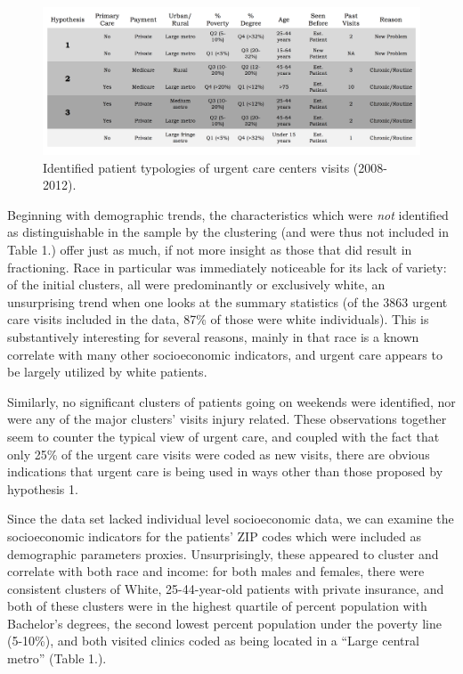 \documentclass[12pt,twoside]{reedthesis}
\begin{document}
  \newpage
  
  \begin{figure}[h!]
  \centering
  \includegraphics[angle = 90,scale = 0.45]{figures/clusters.png}
  \caption[Identified patient typologies of urgent care centers visits (2008-2012).]{\normalsize{Identified patient typologies of urgent care centers visits (2008-2012).}}
  \label{fig:clus1}
  \end{figure}
  
  \newpage
  
  Beginning with demographic trends, the characteristics which were
  \emph{not} identified as distinguishable in the sample by the clustering
  (and were thus not included in Table 1.) offer just as much, if not more
  insight as those that did result in fractioning. Race in particular was
  immediately noticeable for its lack of variety: of the initial clusters,
  all were predominantly or exclusively white, an unsurprising trend when
  one looks at the summary statistics (of the 3863 urgent care visits
  included in the data, 87\% of those were white individuals). This is
  substantively interesting for several reasons, mainly in that race is a
  known correlate with many other socioeconomic indicators, and urgent
  care appears to be largely utilized by white patients.
  
  Similarly, no significant clusters of patients going on weekends were
  identified, nor were any of the major clusters' visits injury related.
  These observations together seem to counter the typical view of urgent
  care, and coupled with the fact that only 25\% of the urgent care visits
  were coded as new visits, there are obvious indications that urgent care
  is being used in ways other than those proposed by hypothesis 1.
  
  Since the data set lacked individual level socioeconomic data, we can
  examine the socioeconomic indicators for the patients' ZIP codes which
  were included as demographic parameters proxies. Unsurprisingly, these
  appeared to cluster and correlate with both race and income: for both
  males and females, there were consistent clusters of White,
  25-44-year-old patients with private insurance, and both of these
  clusters were in the highest quartile of percent population with
  Bachelor's degrees, the second lowest percent population under the
  poverty line (5-10\%), and both visited clinics coded as being located
  in a ``Large central metro'' (Table 1.).
  
\end{document}
